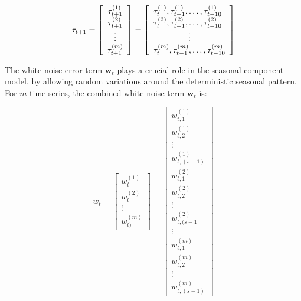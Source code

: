     \begin{equation}
        \tau_{t+1}=
            \left[
                \begin{array}{c}
                    \tau_{t+1}^{(1)} \\
                    \tau_{t+1}^{(2)} \\
                    \hfill \vdots \hfill \\
                    \tau_{t+1}^{(m)}
                    \end{array}\right]
            =\left[
                \begin{array}{l}
                    \tau_t^{(1)}, \tau_{t-1}^{(1)}, \ldots, \tau_{t-10}^{(1)} \\
                    \tau_t^{(2)}, \tau_{t-1}^{(2)}, \ldots, \tau_{t-10}^{(2)} \\
                    \hfill \vdots \hfill \\
                    \tau_t^{(m)}, \tau_{t-1}^{(m)}, \ldots, \tau_{t-10}^{(m)}
                \end{array}
            \right]
        \label{eq:seasonal_state}
    \end{equation}

    The white noise error term $\bm{w}_{t}$ plays a crucial role in the seasonal component model,
    by allowing random variations around the deterministic seasonal pattern.
    For $m$ time series, the combined white noise term $\bm{w}_{t}$ is:

    \begin{equation}
        w_t=
            \left[
                \begin{array}{c}
                    w_{t}^{(1)} \\
                    w_{t}^{(2)} \\
                    \vdots \\
                    w_{t)}^{(m)}
                \end{array}
            \right]
           =
            \left[
                \begin{array}{c}
                    w_{t, 1}^{(1)} \\
                    w_{t, 2}^{(1)} \\
                    \vdots \\
                    w_{t, (s-1)}^{(1)} \\
                    w_{t, 1}^{(2)} \\
                    w_{t, 2}^{(2)} \\
                    \vdots \\
                    w_{t, (s-1}^{(2)} \\
                    \vdots \\
                    w_{t, 1}^{(m)} \\
                    w_{t, 2}^{(m)} \\
                    \vdots \\
                    w_{t, (s-1)}^{(m)}
                \end{array}
            \right]
    \label{eq:seasonal_error}
    \end{equation}

